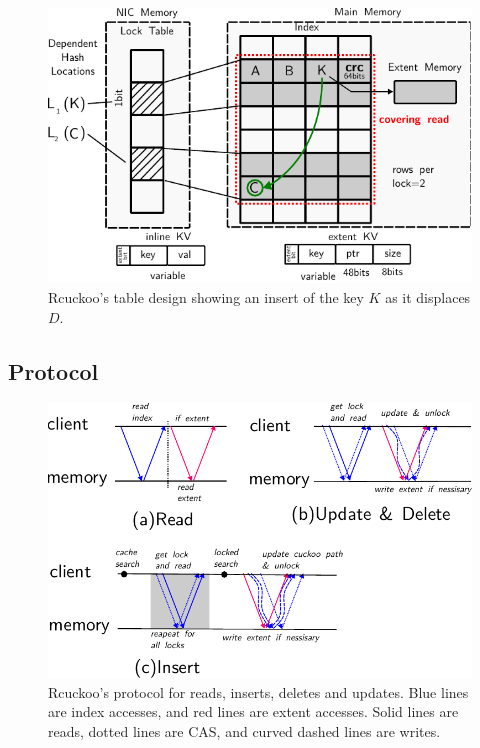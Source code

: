 \begin{figure}[t]
    \includegraphics[width=0.99\linewidth]{fig/table-diagram.pdf}
    \caption{Rcuckoo's table design showing an insert of the key $K$ as it displaces $D$.~}
    \label{fig:table-diagram}
\end{figure}


\subsection{Protocol}

\begin{figure}[t]
\includegraphics[width=0.99\linewidth]{fig/message_diagram.pdf}

\caption{Rcuckoo's protocol for reads, inserts, deletes and
updates. Blue lines are index accesses, and red lines are
extent accesses. Solid lines are reads, dotted lines are
CAS, and curved dashed lines are writes.}

\label{fig:message_diagram}
\end{figure}


